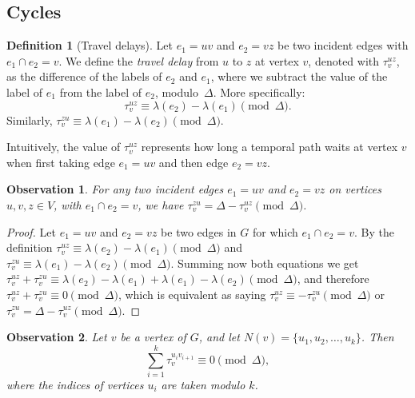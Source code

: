 \documentclass[11pt,a4paper]{article}
\newtheorem{observation}{Observation}
\theoremstyle{remark}
\theoremstyle{definition}
\newtheorem{definition}[theorem]{Definition}
\begin{document}
    \subsection*{Cycles}
    \begin{definition}[Travel delays]
    Let $e_1=uv$ and $e_2=vz$ be two incident edges with $e_1 \cap e_2 = v$.
    We define the \emph{travel delay} from $u$ to $z$ at vertex $v$, denoted with $\tau_v^{uz}$,
    as the difference of the labels of $e_2$ and $e_1$, where we subtract the value of the label of $e_1$ from the label of $e_2$,  modulo~$\Delta$.
    More specifically:
    \begin{equation}\label{eq:def-VertexWaitingTimes}
       \tau_v^{uz} \equiv \lambda (e_2) - \lambda(e_1) \pmod \Delta.
    \end{equation}
    Similarly, $\tau_v^{zu} \equiv \lambda (e_1) - \lambda(e_2) \pmod \Delta$.
    \end{definition}
    Intuitively, the value of $\tau_v^{uz}$ represents how long a temporal path waits at vertex $v$ when first taking edge $e_1=uv$ and then edge $e_2 = vz$.
    
    \begin{observation}
    For any two incident edges $e_1 = uv$ and $e_2 = vz$ on vertices $u,v,z \in V$, with $e_1 \cap e_2 = v$, we have $\tau_v^{zu} = \Delta - \tau_v^{uz} \pmod \Delta$.
    \end{observation}
    
    \begin{proof}
        Let $e_1 = uv$ and $e_2 = vz$ be two edges in $G$ for which $e_1 \cap e_2 = v$. 
        By the definition $\tau_v^{uz} \equiv \lambda (e_2) - \lambda(e_1) \pmod \Delta$ and $\tau_v^{zu} \equiv \lambda (e_1) - \lambda(e_2) \pmod \Delta$.
        Summing now both equations we get $\tau_v^{uz} + \tau_v^{zu} \equiv \lambda(e_2) - \lambda(e_1) + \lambda (e_1) - \lambda(e_2) \pmod \Delta$, and therefore $\tau_v^{uz} + \tau_v^{zu} \equiv 0 \pmod \Delta$, which is equivalent as saying $\tau_v^{uz} \equiv - \tau_v^{zu} \pmod \Delta$ or $\tau_v^{zu} = \Delta - \tau_v^{uz} \pmod \Delta$.
    \end{proof}

    \begin{observation} \label{obs:exact-VertexSum}
    Let $v$ be a vertex of $G$, and let $N(v)=\{u_1, u_2, \ldots, u_k\}$. Then 
    \begin{equation*}
        \sum_{i = 1}^k \tau_{v}^{u_{i}v_{i+1}} \equiv  0 \pmod \Delta,
    \end{equation*}
    where the indices of vertices $u_i$ are taken modulo $k$.
    \end{observation}
\end{document}
